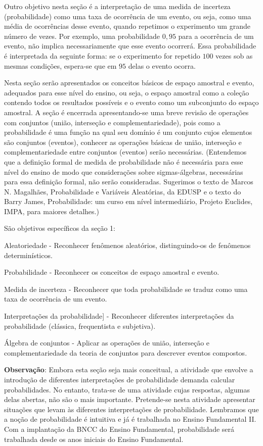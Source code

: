\begin{texto}
{
  Outro objetivo nesta seção é a interpretação de uma medida de incerteza (probabilidade) como uma taxa de ocorrência de um evento, ou seja, como uma média de ocorrências desse evento, quando repetimos o experimento um grande número de vezes. Por exemplo, uma probabilidade $0{,}95$ para a ocorrência de um evento, não implica necessariamente que esse evento ocorrerá. Essa probabilidade é interpretada da seguinte forma: se o experimento for repetido $100$ vezes sob as mesmas condições, espera-se que em $95$ delas o evento ocorra.

  Nesta seção serão apresentados os conceitos básicos de espaço amostral e evento, adequados para esse nível do ensino, ou seja, o espaço amostral como a coleção contendo todos os resultados possíveis e o evento como um subconjunto do espaço amostral. A seção é encerrada apresentando-se uma breve revisão de operações com conjuntos (união, interseção e complementariedade), pois como a probabilidade é uma função na qual seu domínio é um conjunto cujos elementos são conjuntos (eventos), conhecer as operações básicas de união, interseção e complementariedade entre conjuntos (eventos) serão necessárias. (Entendemos que a definição formal de medida de probabilidade não é necessária para esse nível do ensino de modo que considerações sobre sigmas-álgebras, necessárias para essa definição formal, não serão consideradas. Sugerimos o texto de Marcos N. Magalhães, Probabilidade e Variáveis Aleatórias, da EDUSP e o texto do Barry James, Probabilidade: um curso em nível intermediário, Projeto Euclides, IMPA, para maiores detalhes.)

  São objetivos específicos da seção 1:

  \begin{OES}
  \item Aleatoriedade - Reconhecer fenômenos aleatórios, distinguindo-os de fenômenos determinísticos.
  \item Probabilidade - Reconhecer os conceitos de espaço amostral e evento.
  \item Medida de incerteza - Reconhecer que toda probabilidade se traduz como uma taxa de ocorrência de um evento.
  \item Interpretações da probabilidade] - Reconhecer diferentes interpretações da probabilidade (clássica, frequentista e subjetiva).
  \item Álgebra de conjuntos - Aplicar as operações de união, interseção e complementariedade da teoria de conjuntos para descrever eventos compostos.
  \end{OES}

  \textbf{Observação}: Embora esta seção seja mais conceitual, a atividade que envolve a introdução de diferentes interpretações de probabilidade demanda calcular probabilidades. No entanto, trata-se de uma atividade cujas respostas, algumas delas abertas, não são o mais importante. Pretende-se nesta atividade apresentar situações que levam às diferentes interpretações de probabilidade. Lembramos que a noção de probabilidade é intuitiva e já é trabalhada no Ensino Fundamental II. Com a implantação da BNCC do Ensino Fundamental, probabilidade será trabalhada desde os anos iniciais do Ensino Fundamental.
}
\end{texto}
